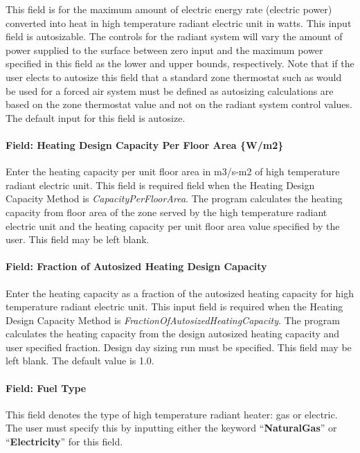 This field is for the maximum amount of electric energy rate (electric power) converted into heat in high temperature radiant electric unit in watts. This input field is autosizable. The controls for the radiant system will vary the amount of power supplied to the surface between zero input and the maximum power specified in this field as the lower and upper bounds, respectively. Note that if the user elects to autosize this field that a standard zone thermostat such as would be used for a forced air system must be defined as autosizing calculations are based on the zone thermostat value and not on the radiant system control values. The default input for this field is autosize.

\paragraph{Field: Heating Design Capacity Per Floor Area \{W/m2\}}\label{field-heating-design-capacity-per-floor-area-wm2-7}

Enter the heating capacity per unit floor area in m3/s-m2 of high temperature radiant electric unit. This field is required field when the Heating Design Capacity Method is \emph{CapacityPerFloorArea}. The program calculates the heating capacity from floor area of the zone served by the high temperature radiant electric unit and the heating capacity per unit floor area value specified by the user. This field may be left blank.

\paragraph{Field: Fraction of Autosized Heating Design Capacity}\label{field-fraction-of-autosized-heating-design-capacity-7}

Enter the heating capacity as a fraction of the autosized heating capacity for high temperature radiant electric unit. This input field is required when the Heating Design Capacity Method is \emph{FractionOfAutosizedHeatingCapacity}. The program calculates the heating capacity from the design autosized heating capacity and user specified fraction. Design day sizing run must be specified. This field may be left blank. The default value is 1.0.

\paragraph{Field: Fuel Type}\label{field-fuel-type-003}

This field denotes the type of high temperature radiant heater: gas or electric. The user must specify this by inputting either the keyword ``\textbf{NaturalGas}'' or ``\textbf{Electricity}'' for this field.

